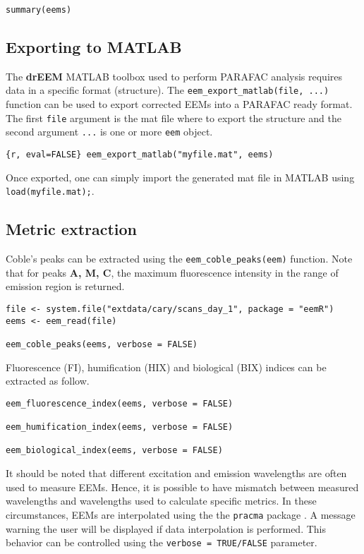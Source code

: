 \documentclass[]{book}
\theoremstyle{definition}
\theoremstyle{definition}
\theoremstyle{remark}
\begin{document}
\begin{verbatim}
summary(eems)
\end{verbatim}

\subsection{Exporting to MATLAB}\label{exporting-to-matlab}

The \textbf{drEEM} MATLAB toolbox \citep{Murphy2013} used to perform
PARAFAC analysis requires data in a specific format (structure). The
\texttt{eem\_export\_matlab(file,\ ...)} function can be used to export
corrected EEMs into a PARAFAC ready format. The first \texttt{file}
argument is the mat file where to export the structure and the second
argument \texttt{...} is one or more \texttt{eem} object.

\texttt{\{r,\ eval=FALSE\}\ eem\_export\_matlab("myfile.mat",\ eems)}

Once exported, one can simply import the generated mat file in MATLAB
using \texttt{load(\textquotesingle{}myfile.mat\textquotesingle{});}.

\subsection{Metric extraction}\label{metric-extraction}

Coble's peaks can be extracted using the \texttt{eem\_coble\_peaks(eem)}
function. Note that for peaks \textbf{A, M, C}, the maximum fluorescence
intensity in the range of emission region is returned.

\begin{verbatim}
file <- system.file("extdata/cary/scans_day_1", package = "eemR")
eems <- eem_read(file)

eem_coble_peaks(eems, verbose = FALSE)
\end{verbatim}

Fluorescence (FI), humification (HIX) and biological (BIX) indices can
be extracted as follow.

\begin{verbatim}
eem_fluorescence_index(eems, verbose = FALSE)

eem_humification_index(eems, verbose = FALSE)

eem_biological_index(eems, verbose = FALSE)
\end{verbatim}

It should be noted that different excitation and emission wavelengths
are often used to measure EEMs. Hence, it is possible to have mismatch
between measured wavelengths and wavelengths used to calculate specific
metrics. In these circumstances, EEMs are interpolated using the the
\texttt{pracma} package \citep{Borchers2015}. A message warning the user
will be displayed if data interpolation is performed. This behavior can
be controlled using the \texttt{verbose\ =\ TRUE/FALSE} parameter.
\end{document}
